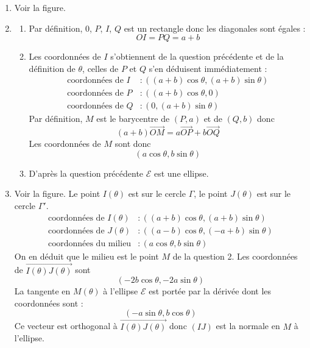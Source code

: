 \begin{enumerate}
 \item Voir la figure.
\item \begin{enumerate}
 \item Par définition, $0$, $P$, $I$, $Q$ est un rectangle donc les diagonales sont égales :
\begin{displaymath}
 OI = PQ =a+b
\end{displaymath}
 
\item Les coordonnées de $I$ s'obtiennent de la question précédente et de la définition de $\theta$, celles de $P$ et $Q$ s'en déduisent immédiatement :
\begin{align*}
 \text{coordonnées de $I$} &: ((a+b)\cos \theta , (a+b)\sin \theta) \\
 \text{coordonnées de $P$} &: ((a+b)\cos \theta , 0) \\
 \text{coordonnées de $Q$} &: (0 , (a+b)\sin \theta) 
\end{align*}
Par définition, $M$ est le barycentre de $(P,a)$ et de $(Q,b)$ donc
\begin{displaymath}
 (a+b)\overrightarrow{OM} = a\overrightarrow{OP} +  b\overrightarrow{OQ}
\end{displaymath}
Les coordonnées de $M$ sont donc
\begin{displaymath}
 (a\cos \theta , b \sin \theta)
\end{displaymath}
\item D'après la question précédente $\mathcal E$ est une ellipse.
\end{enumerate}
\item Voir la figure. Le point $I(\theta)$ est sur le cercle $\Gamma$, le point $J(\theta)$ est sur le cercle $\Gamma '$.
\begin{align*}
 \text{coordonnées de $I(\theta)$} &:  ((a+b)\cos \theta , (a+b)\sin \theta) \\
 \text{coordonnées de $J(\theta)$} &:  ((a-b)\cos \theta , (-a+b)\sin \theta) \\
 \text{coordonnées du milieu} &: (a\cos \theta , b\sin \theta) 
\end{align*}
On en déduit que le milieu est le point $M$ de la question 2.\newline
Les coordonnées de $\overrightarrow{I(\theta)J(\theta)}$ sont 
\begin{displaymath}
 (-2b\cos \theta , -2a \sin \theta)
\end{displaymath}
La tangente en $M(\theta)$ à l'ellipse $\mathcal E$ est portée par la dérivée dont les coordonnées sont :
\begin{displaymath}
 (-a\sin \theta , b\cos \theta)
\end{displaymath}
Ce vecteur est orthogonal à $\overrightarrow{I(\theta)J(\theta)}$ donc $(IJ)$ est la normale en $M$ à l'ellipse.
\end{enumerate}

